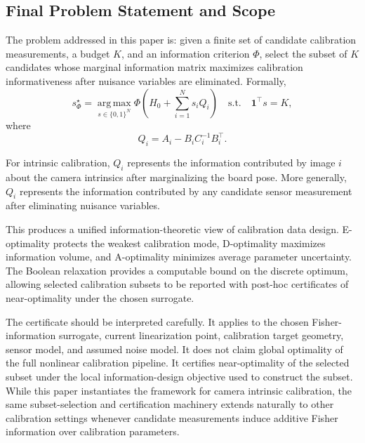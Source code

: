 \documentclass[letterpaper, 9
 pt, conference]{ieeeconf}
\begin{document}
\subsection{Final Problem Statement and Scope}
\label{subsec:final_problem_statement}

The problem addressed in this paper is: given a finite set of candidate calibration measurements, a budget $K$, and an information criterion $\Phi$, select the subset of $K$ candidates whose marginal information matrix maximizes calibration informativeness after nuisance variables are eliminated. Formally,
\begin{equation}
\boxed{
    s_\Phi^\star
    =
    \operatorname*{arg\,max}_{s\in\{0,1\}^{N}}
    \Phi
    \left(
    H_0+\sum_{i=1}^{N}s_iQ_i
    \right)
    \quad
    \text{s.t.}
    \quad
    \mathbf{1}^{\top}s=K,
}
\end{equation}
where
\begin{equation}
    Q_i
    =
    A_i-B_iC_i^{-1}B_i^\top.
\end{equation}

For intrinsic calibration, $Q_i$ represents the information contributed by image $i$ about the camera intrinsics after marginalizing the board pose. More generally, $Q_i$ represents the information contributed by any candidate sensor measurement after eliminating nuisance variables.

This produces a unified information-theoretic view of calibration data design. E-optimality protects the weakest calibration mode, D-optimality maximizes information volume, and A-optimality minimizes average parameter uncertainty. The Boolean relaxation provides a computable bound on the discrete optimum, allowing selected calibration subsets to be reported with post-hoc certificates of near-optimality under the chosen surrogate.

The certificate should be interpreted carefully. It applies to the chosen Fisher-information surrogate, current linearization point, calibration target geometry, sensor model, and assumed noise model. It does not claim global optimality of the full nonlinear calibration pipeline. It certifies near-optimality of the selected subset under the local information-design objective used to construct the subset. While this paper instantiates the framework for camera intrinsic calibration, the same subset-selection and certification machinery extends naturally to other calibration settings whenever candidate measurements induce additive Fisher information over calibration parameters.
\end{document}
